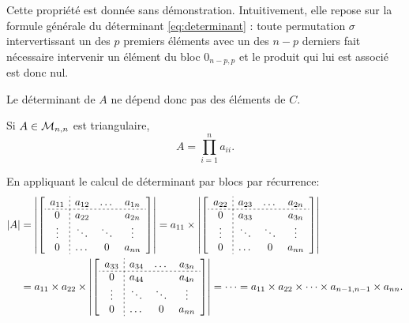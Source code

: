 \proof
Cette propriété est donnée sans démonstration. Intuitivement, elle repose sur la formule générale du déterminant \eqref{eq:determinant} : toute permutation $\sigma$ intervertissant un des $p$ premiers éléments avec un des $n-p$ derniers fait nécessaire intervenir un élément du bloc $0_{n-p, p}$ et le produit qui lui est associé est donc nul.
\eproof

\remark Le déterminant de $A$ ne dépend donc pas des éléments de $C$.

\begin{proposition*}
  Si $A \in \mathcal{M}_{n,n}$ est triangulaire, 
  $$
  A = \prod_{i=1}^n a_{ii}.
  $$
\end{proposition*}

\proof
En appliquant le calcul de déterminant par blocs par récurrence:
\begin{align*}
  |A| 
  & = 
  \left|\left[\begin{array}{c;{2pt/2pt}ccc}
                a_{11} & a_{12} & \dots & a_{1n} \\
                \hdashline[2pt/2pt]
                0 & a_{22} &  & a_{2n} \\
                \vdots  & \ddots & \ddots & \vdots \\
                0 & \dots & 0 & a_{nn} \\
              \end{array}\right]\right| 
  = a_{11} \times 
  \left|\left[\begin{array}{c;{2pt/2pt}ccc}
                a_{22} & a_{23} & \dots & a_{2n} \\
                \hdashline[2pt/2pt]
                0 & a_{33} &  & a_{3n} \\
                \vdots & \ddots & \ddots & \vdots \\
                0 & \dots & 0 & a_{nn} \\
              \end{array}\right]\right| \\
  & = a_{11} \times a_{22} \times 
  \left|\left[\begin{array}{c;{2pt/2pt}ccc}
                a_{33} & a_{34} & \dots & a_{3n} \\
                \hdashline[2pt/2pt]
                0 & a_{44} &  & a_{4n} \\
                \vdots  & \ddots & \ddots & \vdots \\
                0 & \dots & 0 & a_{nn} \\
              \end{array}\right]\right| 
  = \dots = a_{11} \times a_{22} \times \dots \times a_{n-1, n-1} \times a_{nn}.
\end{align*}
\eproof

